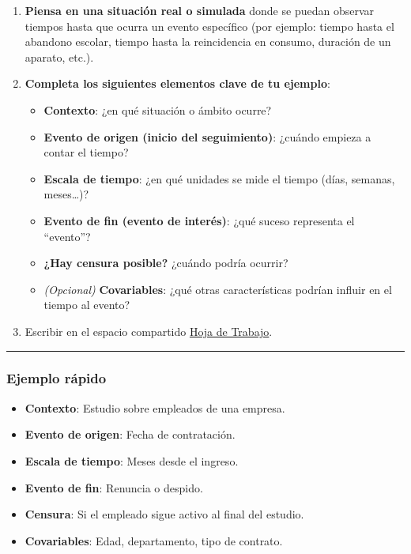 \documentclass[
  letterpaper,
  DIV=11,
  numbers=noendperiod]{scrartcl}
\providecommand{\tightlist}{%
  \setlength{\itemsep}{0pt}\setlength{\parskip}{0pt}}
\begin{document}
\begin{enumerate}
\def\labelenumi{\arabic{enumi}.}
\item
  \textbf{Piensa en una situación real o simulada} donde se puedan
  observar tiempos hasta que ocurra un evento específico (por ejemplo:
  tiempo hasta el abandono escolar, tiempo hasta la reincidencia en
  consumo, duración de un aparato, etc.).
\item
  \textbf{Completa los siguientes elementos clave de tu ejemplo}:

  \begin{itemize}
  \tightlist
  \item
    \textbf{Contexto}: ¿en qué situación o ámbito ocurre?
  \item
    \textbf{Evento de origen (inicio del seguimiento)}: ¿cuándo empieza
    a contar el tiempo?
  \item
    \textbf{Escala de tiempo}: ¿en qué unidades se mide el tiempo (días,
    semanas, meses\ldots)?
  \item
    \textbf{Evento de fin (evento de interés)}: ¿qué suceso representa
    el ``evento''?
  \item
    \textbf{¿Hay censura posible?} ¿cuándo podría ocurrir?
  \item
    \emph{(Opcional)} \textbf{Covariables}: ¿qué otras características
    podrían influir en el tiempo al evento?
  \end{itemize}
\item
  Escribir en el espacio compartido
  \href{https://tinyurl.com/mrkww672}{Hoja de Trabajo}.
\end{enumerate}

\begin{center}\rule{0.5\linewidth}{0.5pt}\end{center}

\subsubsection{Ejemplo rápido}\label{ejemplo-ruxe1pido}

\begin{itemize}
\tightlist
\item
  \textbf{Contexto}: Estudio sobre empleados de una empresa.\\
\item
  \textbf{Evento de origen}: Fecha de contratación.\\
\item
  \textbf{Escala de tiempo}: Meses desde el ingreso.\\
\item
  \textbf{Evento de fin}: Renuncia o despido.\\
\item
  \textbf{Censura}: Si el empleado sigue activo al final del estudio.\\
\item
  \textbf{Covariables}: Edad, departamento, tipo de contrato.
\end{itemize}
\end{document}
